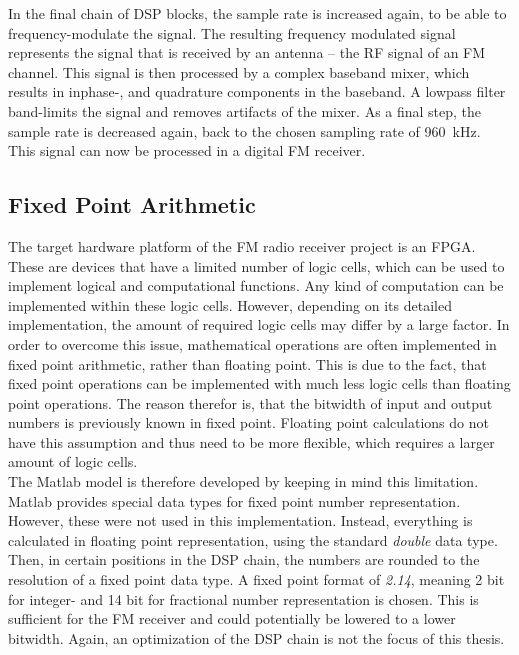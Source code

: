 In the final chain of DSP blocks, the sample rate is increased again, to be able to frequency-modulate the signal.
The resulting frequency modulated signal represents the signal that is received by an antenna -- the RF signal of an FM channel.
This signal is then processed by a complex baseband mixer, which results in inphase-, and quadrature components in the baseband.
A lowpass filter band-limits the signal and removes artifacts of the mixer.
As a final step, the sample rate is decreased again, back to the chosen sampling rate of 960~kHz.
This signal can now be processed in a digital FM receiver.


\subsection{Fixed Point Arithmetic}

The target hardware platform of the FM radio receiver project is an FPGA.
These are devices that have a limited number of logic cells, which can be used to implement logical and computational functions.
Any kind of computation can be implemented within these logic cells.
However, depending on its detailed implementation, the amount of required logic cells may differ by a large factor.
In order to overcome this issue, mathematical operations are often implemented in fixed point arithmetic, rather than floating point.
This is due to the fact, that fixed point operations can be implemented with much less logic cells than floating point operations.
The reason therefor is, that the bitwidth of input and output numbers is previously known in fixed point.
Floating point calculations do not have this assumption and thus need to be more flexible, which requires a larger amount of logic cells.\\

The Matlab model is therefore developed by keeping in mind this limitation.
Matlab provides special data types for fixed point number representation.
However, these were not used in this implementation.
Instead, everything is calculated in floating point representation, using the standard \textit{double} data type.
Then, in certain positions in the DSP chain, the numbers are rounded to the resolution of a fixed point data type.
A fixed point format of \textit{2.14}, meaning 2 bit for integer- and 14 bit for fractional number representation is chosen.
This is sufficient for the FM receiver and could potentially be lowered to a lower bitwidth.
Again, an optimization of the DSP chain is not the focus of this thesis.\\

